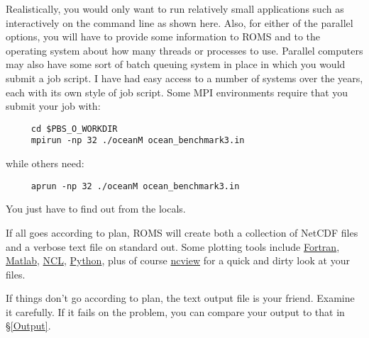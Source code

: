 Realistically, you would only want to run relatively small
applications such as  interactively on the command
line as shown here. Also, for either of the parallel options, you
will have to provide some information to ROMS and to the operating
system about how many threads or processes to use. Parallel
computers may also have some sort of batch queuing system in place
in which you would submit a job script. I have had easy access to a
number of systems over the years,
each with its own style of job script. Some MPI environments
require that you submit your job with:
\begin{verbatim}
     cd $PBS_O_WORKDIR
     mpirun -np 32 ./oceanM ocean_benchmark3.in
\end{verbatim}
while others need:
\begin{verbatim}
     aprun -np 32 ./oceanM ocean_benchmark3.in
\end{verbatim}
You just have to find out from the locals.

If all goes according to plan, ROMS will create both a collection
of NetCDF files and a verbose text file on standard out.
Some plotting tools include
\href{https://www.myroms.org/wiki/index.php/Plotting_Package_Installation}{Fortran},
\href{http://www.mathworks.com/products/matlab/}{Matlab},
\href{http://www.ncl.ucar.edu/}{NCL},
\href{http://www.python.org/}{Python}, plus of course
\href{http://meteora.ucsd.edu/\~pierce/ncview\_home\_page.html}{ncview}
for a quick and dirty look at your files.

If things don't go according to plan, the text output file is your
friend. Examine it carefully. If it fails on the 
problem, you can compare your output to that in \S\ref{Output}.

